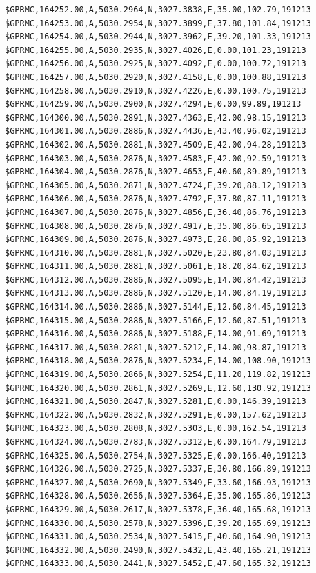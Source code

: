 \documentclass[simple,a4paper,14pt,ukrainian,utf8]{eskdtext}
\begin{document}
\begin{appendices}
\begin{small}
\begin{lstlisting}
$GPRMC,164252.00,A,5030.2964,N,3027.3838,E,35.00,102.79,191213
$GPRMC,164253.00,A,5030.2954,N,3027.3899,E,37.80,101.84,191213
$GPRMC,164254.00,A,5030.2944,N,3027.3962,E,39.20,101.33,191213
$GPRMC,164255.00,A,5030.2935,N,3027.4026,E,0.00,101.23,191213
$GPRMC,164256.00,A,5030.2925,N,3027.4092,E,0.00,100.72,191213
$GPRMC,164257.00,A,5030.2920,N,3027.4158,E,0.00,100.88,191213
$GPRMC,164258.00,A,5030.2910,N,3027.4226,E,0.00,100.75,191213
$GPRMC,164259.00,A,5030.2900,N,3027.4294,E,0.00,99.89,191213
$GPRMC,164300.00,A,5030.2891,N,3027.4363,E,42.00,98.15,191213
$GPRMC,164301.00,A,5030.2886,N,3027.4436,E,43.40,96.02,191213
$GPRMC,164302.00,A,5030.2881,N,3027.4509,E,42.00,94.28,191213
$GPRMC,164303.00,A,5030.2876,N,3027.4583,E,42.00,92.59,191213
$GPRMC,164304.00,A,5030.2876,N,3027.4653,E,40.60,89.89,191213
$GPRMC,164305.00,A,5030.2871,N,3027.4724,E,39.20,88.12,191213
$GPRMC,164306.00,A,5030.2876,N,3027.4792,E,37.80,87.11,191213
$GPRMC,164307.00,A,5030.2876,N,3027.4856,E,36.40,86.76,191213
$GPRMC,164308.00,A,5030.2876,N,3027.4917,E,35.00,86.65,191213
$GPRMC,164309.00,A,5030.2876,N,3027.4973,E,28.00,85.92,191213
$GPRMC,164310.00,A,5030.2881,N,3027.5020,E,23.80,84.03,191213
$GPRMC,164311.00,A,5030.2881,N,3027.5061,E,18.20,84.62,191213
$GPRMC,164312.00,A,5030.2886,N,3027.5095,E,14.00,84.42,191213
$GPRMC,164313.00,A,5030.2886,N,3027.5120,E,14.00,84.19,191213
$GPRMC,164314.00,A,5030.2886,N,3027.5144,E,12.60,84.45,191213
$GPRMC,164315.00,A,5030.2886,N,3027.5166,E,12.60,87.51,191213
$GPRMC,164316.00,A,5030.2886,N,3027.5188,E,14.00,91.69,191213
$GPRMC,164317.00,A,5030.2881,N,3027.5212,E,14.00,98.87,191213
$GPRMC,164318.00,A,5030.2876,N,3027.5234,E,14.00,108.90,191213
$GPRMC,164319.00,A,5030.2866,N,3027.5254,E,11.20,119.82,191213
$GPRMC,164320.00,A,5030.2861,N,3027.5269,E,12.60,130.92,191213
$GPRMC,164321.00,A,5030.2847,N,3027.5281,E,0.00,146.39,191213
$GPRMC,164322.00,A,5030.2832,N,3027.5291,E,0.00,157.62,191213
$GPRMC,164323.00,A,5030.2808,N,3027.5303,E,0.00,162.54,191213
$GPRMC,164324.00,A,5030.2783,N,3027.5312,E,0.00,164.79,191213
$GPRMC,164325.00,A,5030.2754,N,3027.5325,E,0.00,166.40,191213
$GPRMC,164326.00,A,5030.2725,N,3027.5337,E,30.80,166.89,191213
$GPRMC,164327.00,A,5030.2690,N,3027.5349,E,33.60,166.93,191213
$GPRMC,164328.00,A,5030.2656,N,3027.5364,E,35.00,165.86,191213
$GPRMC,164329.00,A,5030.2617,N,3027.5378,E,36.40,165.68,191213
$GPRMC,164330.00,A,5030.2578,N,3027.5396,E,39.20,165.69,191213
$GPRMC,164331.00,A,5030.2534,N,3027.5415,E,40.60,164.90,191213
$GPRMC,164332.00,A,5030.2490,N,3027.5432,E,43.40,165.21,191213
$GPRMC,164333.00,A,5030.2441,N,3027.5452,E,47.60,165.32,191213

\end{lstlisting}
\end{small}
\end{appendices}
\end{document}
